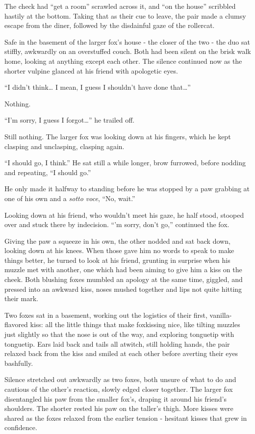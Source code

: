 The check had ``get a room'' scrawled across it, and ``on the house'' scribbled hastily at the bottom. Taking that as their cue to leave, the pair made a clumsy escape from the diner, followed by the disdainful gaze of the rollercat.

\secdiv{}

Safe in the basement of the larger fox's house - the closer of the two - the duo sat stiffly, awkwardly on an overstuffed couch. Both had been silent on the brisk walk home, looking at anything except each other. The silence continued now as the shorter vulpine glanced at his friend with apologetic eyes.

``I didn't think\ldots{} I mean, I guess I shouldn't have done that\ldots{}''

Nothing.

``I'm sorry, I guess I forgot\ldots{}'' he trailed off.

Still nothing. The larger fox was looking down at his fingers, which he kept clasping and unclasping, clasping again.

``I should go, I think.'' He sat still a while longer, brow furrowed, before nodding and repeating, ``I should go.''

He only made it halfway to standing before he was stopped by a paw grabbing at one of his own and a \emph{sotto voce}, ``No, wait.''

Looking down at his friend, who wouldn't meet his gaze, he half stood, stooped over and stuck there by indecision. ``'m sorry, don't go,'' continued the fox.

Giving the paw a squeeze in his own, the other nodded and sat back down, looking down at his knees. When those gave him no words to speak to make things better, he turned to look at his friend, grunting in surprise when his muzzle met with another, one which had been aiming to give him a kiss on the cheek. Both blushing foxes mumbled an apology at the same time, giggled, and pressed into an awkward kiss, noses mushed together and lips not quite hitting their mark.

Two foxes sat in a basement, working out the logistics of their first, vanilla-flavored kiss: all the little things that make foxkissing nice, like tilting muzzles just slightly so that the nose is out of the way, and exploring tonguetip with tonguetip. Ears laid back and tails all atwitch, still holding hands, the pair relaxed back from the kiss and smiled at each other before averting their eyes bashfully.

Silence stretched out awkwardly as two foxes, both unsure of what to do and cautious of the other's reaction, slowly edged closer together. The larger fox disentangled his paw from the smaller fox's, draping it around his friend's shoulders. The shorter rested his paw on the taller's thigh. More kisses were shared as the foxes relaxed from the earlier tension - hesitant kisses that grew in confidence.

